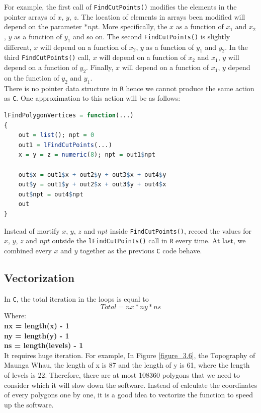 \documentclass{report}
\begin{document}
For example, the first call of \texttt{FindCutPoints()} modifies the elements in the pointer arrays of $x$, $y$, $z$. The location of elements in arrays been modified will depend on the parameter $*npt$. More specifically, the $x$ as a function of $x_1$ and $x_2$, $y$ as a function of $y_1$ and so on. The second \texttt{FindCutPoints()} is slightly different, $x$ will depend on a function of $x_2$, $y$ as a function of $y_1$ and $y_2$. In the third \texttt{FindCutPoints()} call, $x$ will depend on a function of $x_2$ and $x_1$, $y$ will depend on a function of $y_2$. Finally, $x$ will depend on a function of $x_1$, $y$ depend on the function of $y_2$ and $y_1$. \\

There is no pointer data structure in \texttt{R} hence we cannot produce the same action as \texttt{C}. One approximation to this action will be as follows:
\begin{lstlisting}[language = R]
lFindPolygonVertices = function(...)
{
    out = list(); npt = 0
    out1 = lFindCutPoints(...)
    x = y = z = numeric(8); npt = out1$npt

    out$x = out1$x + out2$y + out3$x + out4$y
    out$y = out1$y + out2$x + out3$y + out4$x
    out$npt = out4$npt
    out
}
\end{lstlisting}
Instead of mortify $x$, $y$, $z$ and $npt$ inside \texttt{FindCutPoints()}, record the values for $x$, $y$, $z$ and $npt$ outside the \texttt{lFindCutPoints()} call in \texttt{R} every time. At last, we combined every $x$ and $y$ together as the previous \texttt{C} code behave. 


\subsection{Vectorization}
In \texttt{C}, the total iteration in the loops is equal to
\begin{equation}
Total = nx * ny * ns
\end{equation}
Where:\\
\textbf{nx = length(x) - 1}\\
\textbf{ny = length(y) - 1}\\
\textbf{ns = length(levels) - 1}\\

It requires huge iteration. For example, In Figure \ref{figure_3.6}, the Topography of Maunga Whau, the length of x is 87 and the length of y is 61, where the length of levels is 22. Therefore, there are at most 108360 polygons that we need to consider which it will slow down the software. Instead of calculate the coordinates of every polygons one by one, it is a good idea to vectorize the function to speed up the software.
\end{document}
